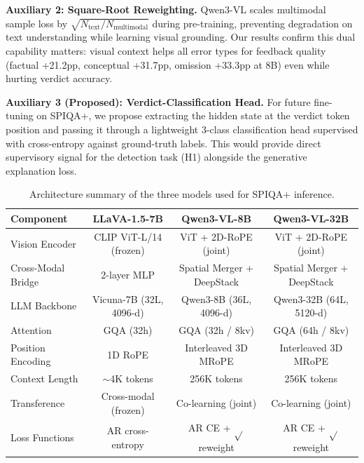 \textbf{Auxiliary 2: Square-Root Reweighting.} Qwen3-VL scales multimodal sample loss by $\sqrt{N_\text{text}/N_\text{multimodal}}$ during pre-training, preventing degradation on text understanding while learning visual grounding. Our results confirm this dual capability matters: visual context helps all error types for feedback quality (factual +21.2pp, conceptual +31.7pp, omission +33.3pp at 8B) even while hurting verdict accuracy.

\textbf{Auxiliary 3 (Proposed): Verdict-Classification Head.} For future fine-tuning on SPIQA+, we propose extracting the hidden state at the verdict token position and passing it through a lightweight 3-class classification head supervised with cross-entropy against ground-truth labels. This would provide direct supervisory signal for the detection task (H1) alongside the generative explanation loss.

\begin{table}[t]
\centering
\caption{Architecture summary of the three models used for SPIQA+ inference.}
\label{tab:arch-summary}
\small
\begin{tabular}{@{}lccc@{}}
\toprule
\textbf{Component} & \textbf{LLaVA-1.5-7B} & \textbf{Qwen3-VL-8B} & \textbf{Qwen3-VL-32B} \\
\midrule
Vision Encoder & CLIP ViT-L/14 (frozen) & ViT + 2D-RoPE (joint) & ViT + 2D-RoPE (joint) \\
Cross-Modal Bridge & 2-layer MLP & Spatial Merger + DeepStack & Spatial Merger + DeepStack \\
LLM Backbone & Vicuna-7B (32L, 4096-d) & Qwen3-8B (36L, 4096-d) & Qwen3-32B (64L, 5120-d) \\
Attention & GQA (32h) & GQA (32h / 8kv) & GQA (64h / 8kv) \\
Position Encoding & 1D RoPE & Interleaved 3D MRoPE & Interleaved 3D MRoPE \\
Context Length & ${\sim}$4K tokens & 256K tokens & 256K tokens \\
Transference & Cross-modal (frozen) & Co-learning (joint) & Co-learning (joint) \\
Loss Functions & AR cross-entropy & AR CE + $\sqrt{}$ reweight & AR CE + $\sqrt{}$ reweight \\
\bottomrule
\end{tabular}
\end{table}
